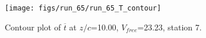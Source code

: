\begin{figure}[H]
\centering
\texttt{[image: figs/run\_65/run\_65\_T\_contour]}
\caption{Contour plot of $\overline{t}$ at $z/c$=10.00, $V_{free}$=23.23, station 7.}
\end{figure}


